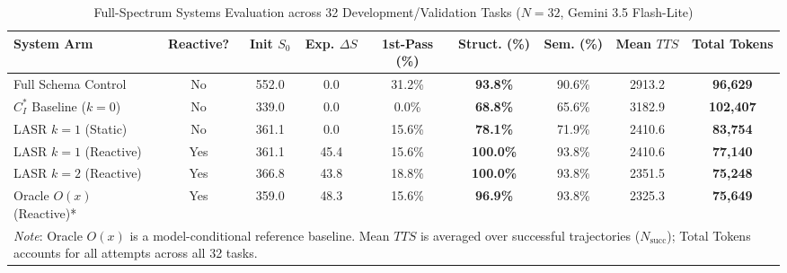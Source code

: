 \begin{table}[t]
\centering
\caption{Full-Spectrum Systems Evaluation across 32 Development/Validation Tasks ($N=32$, Gemini 3.5 Flash-Lite)}
\label{tab:systems_evaluation}
\small
\begin{tabular}{lcccccccc}
\toprule
\textbf{System Arm} & \textbf{Reactive?} & \textbf{Init $S_0$} & \textbf{Exp. $\Delta S$} & \textbf{1st-Pass (\%)} & \textbf{Struct. (\%)} & \textbf{Sem. (\%)} & \textbf{Mean $TTS$} & \textbf{Total Tokens} \\
\midrule
Full Schema Control & No & 552.0 & 0.0 & 31.2\% & \textbf{93.8\%} & 90.6\% & 2913.2 & \textbf{96,629} \\
$C_I^*$ Baseline ($k=0$) & No & 339.0 & 0.0 & 0.0\% & \textbf{68.8\%} & 65.6\% & 3182.9 & \textbf{102,407} \\
LASR $k=1$ (Static) & No & 361.1 & 0.0 & 15.6\% & \textbf{78.1\%} & 71.9\% & 2410.6 & \textbf{83,754} \\
LASR $k=1$ (Reactive) & Yes & 361.1 & 45.4 & 15.6\% & \textbf{100.0\%} & 93.8\% & 2410.6 & \textbf{77,140} \\
LASR $k=2$ (Reactive) & Yes & 366.8 & 43.8 & 18.8\% & \textbf{100.0\%} & 93.8\% & 2351.5 & \textbf{75,248} \\
Oracle $O(x)$ (Reactive)* & Yes & 359.0 & 48.3 & 15.6\% & \textbf{96.9\%} & 93.8\% & 2325.3 & \textbf{75,649} \\
\bottomrule
\multicolumn{9}{p{0.92\textwidth}}{\footnotesize *\textit{Note}: Oracle $O(x)$ is a model-conditional reference baseline. Mean $TTS$ is averaged over successful trajectories ($N_{\text{succ}}$); Total Tokens accounts for all attempts across all 32 tasks.} \\
\end{tabular}
\end{table}
